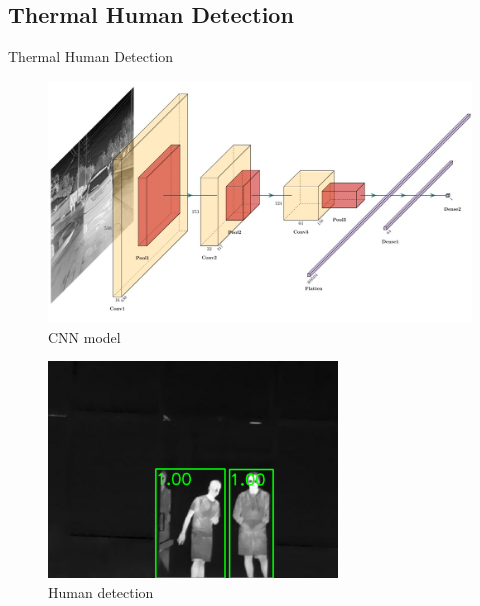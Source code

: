 \documentclass[10pt]{beamer}
\begin{document}
\subsection*{Thermal Human Detection}
\begin{frame}{Thermal Human Detection}
    \begin{minipage}{0.47\textwidth}
        \begin{figure}[h!]
               \centering
               \includegraphics[scale=0.095]{NN.jpeg}
               \caption{CNN model}
               \label{Fig:NN}
           \end{figure}
       \end{minipage}
       \begin{minipage}{0.47\textwidth}
                \begin{figure}[h!]
               \centering
               \includegraphics[scale=0.3]{272.png} 
               \caption{Human detection }
               \label{Fig:human_detec}
           \end{figure}
       \end{minipage}


\end{frame}
\end{document}
